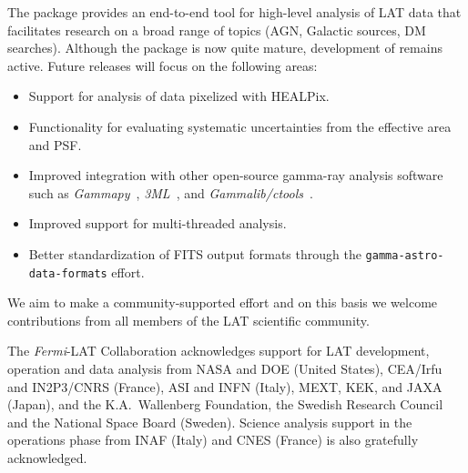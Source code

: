 \documentclass{PoS}
\begin{document}
The {\fermipy} package provides an end-to-end tool for high-level
analysis of LAT data that facilitates research on a broad range of
topics (AGN, Galactic sources, DM searches).  Although the package is
now quite mature, development of {\fermipy} remains active.  Future
releases will focus on the following areas:
\begin{itemize}
\item Support for analysis of data pixelized with HEALPix.
\item Functionality for evaluating systematic uncertainties from the
  effective area and PSF.
\item Improved integration with other open-source gamma-ray analysis
  software such as \emph{Gammapy}~\cite{2015ICRC...34..789D},
  \emph{3ML}~\cite{2015arXiv150708343V}, and
  \emph{Gammalib/ctools}~\cite{2016A&A...593A...1K}.
\item Improved support for multi-threaded analysis.
\item Better standardization of FITS output formats through the
  \texttt{gamma-astro-data-formats} effort.
\end{itemize}
We aim to make {\fermipy} a community-supported effort and on this
basis we welcome contributions from all members of the LAT scientific
community.

\acknowledgments

The \textit{Fermi}-LAT Collaboration acknowledges support for LAT
development, operation and data analysis from NASA and DOE (United
States), CEA/Irfu and IN2P3/CNRS (France), ASI and INFN (Italy), MEXT,
KEK, and JAXA (Japan), and the K.A.~Wallenberg Foundation, the Swedish
Research Council and the National Space Board (Sweden). Science
analysis support in the operations phase from INAF (Italy) and CNES
(France) is also gratefully acknowledged.





\end{document}

